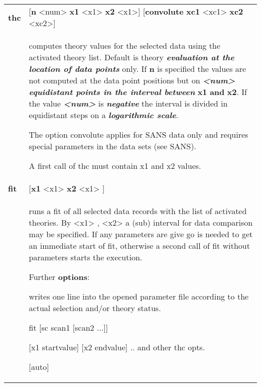 \documentclass[]{article}
\begin{document}
\begin{longtable}[]{@{}ll@{}}
\toprule
\endhead
\textbf{thc} & {[}\textbf{n} \textless{}num\textgreater{} \textbf{x1}
\textless{}x1\textgreater{} \textbf{x2} \textless{}x1\textgreater{}{]}
{[}\textbf{convolute} \textbf{xc1} \textless{}xc1\textgreater{}
\textbf{xc2} \textless{}xc2\textgreater{}{]}\tabularnewline
\begin{minipage}[t]{0.47\columnwidth}\raggedright
\strut
\end{minipage} & \begin{minipage}[t]{0.47\columnwidth}\raggedright
computes theory values for the selected data using the activated theory
list. Default is theory \emph{\textbf{evaluation at the location of data
points}} only. If \textbf{n} is specified the values are not computed at
the data point positions but on
\emph{\textbf{\textless{}num\textgreater{} equidistant points in the
interval between}} \textbf{x1} \textbf{and} \textbf{x2}. If the value
\emph{\textbf{\textless{}num\textgreater{}}} is \emph{\textbf{negative}}
the interval is divided in equidistant steps on a
\emph{\textbf{logarithmic scale}}.

The option convolute applies for SANS data only and requires special
parameters in the data sets (see SANS).

A first call of thc must contain x1 and x2 values.\strut
\end{minipage}\tabularnewline
\textbf{fit} & {[}\textbf{x1} \textless{}x1\textgreater{} \textbf{x2}
\textless{}x1\textgreater{} {]}\tabularnewline
\begin{minipage}[t]{0.47\columnwidth}\raggedright
\strut
\end{minipage} & \begin{minipage}[t]{0.47\columnwidth}\raggedright
runs a fit of all selected data records with the list of activated
theories. By \textless{}x1\textgreater{} , \textless{}x2\textgreater{} a
(sub) interval for data comparison may be specified. If any parameters
are give go is needed to get an immediate start of fit, otherwise a
second call of fit without parameters starts the execution.

Further \textbf{options}:

writes one line into the opened parameter file according to the actual
selection and/or theory status.

fit {[}sc scan1 {[}scan2 ...{]}{]}

{[}x1 startvalue{]} {[}x2 endvalue{]} .. and other thc opts.

{[}auto{]}


\end{minipage}
\end{longtable}
\end{document}
